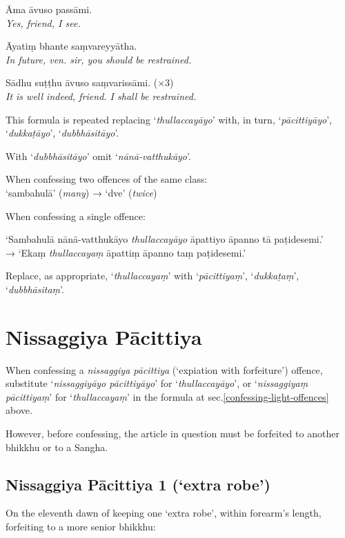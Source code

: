 \hangindent=25pt%
\parbox{22pt}{} Āma āvuso passāmi.\\ \emph{Yes, friend, I see.}

\hangindent=25pt%
\parbox{22pt}{} Āyatiṃ bhante saṃvareyyātha.\\ \emph{In future, ven. sir, you should be restrained.}

\hangindent=25pt%
\parbox{22pt}{} Sādhu suṭṭhu āvuso saṃvarissāmi. (×3)\\ \emph{It is well indeed, friend. I shall be restrained.}

This formula is repeated replacing ‘\emph{thullaccayāyo}’ with, in turn, ‘\emph{pācittiyāyo}’,
‘\emph{dukkaṭāyo}’, ‘\emph{dubbhāsitāyo}’.

With ‘\emph{dubbhāsitāyo}’ omit ‘\emph{nānā-vatthukāyo}’.

When confessing two offences of the same class:\\
‘sambahulā’ (\emph{many}) → ‘dve’ (\emph{twice})

When confessing a single offence:

‘Sambahulā nānā-vatthukāyo \emph{thullaccayāyo} āpattiyo āpanno tā paṭidesemi.’\\
→ ‘Ekaṃ \emph{thullaccayaṃ} āpattiṃ āpanno taṃ paṭidesemi.’

Replace, as appropriate, ‘\emph{thullaccayaṃ}’ with ‘\emph{pācittiyaṃ}’, ‘\emph{dukkaṭaṃ}’, ‘\emph{dubbhāsitaṃ}’.

\section{Nissaggiya Pācittiya}

When confessing a \emph{nissaggiya pācittiya} (‘expiation with forfeiture’)
offence, substitute ‘\emph{nissaggiyāyo pācittiyāyo}’ for
‘\emph{thullaccayāyo}’, or ‘\emph{nissaggiyaṃ pācittiyaṃ}’ for
‘\emph{thullaccayaṃ}’ in the formula at sec.\ref{confessing-light-offences}
above.

However, before confessing, the article in question must be forfeited to another
bhikkhu or to a Sangha. 

\subsection[NP 1 (‘extra robe’)]{Nissaggiya Pācittiya 1 (‘extra robe’)}
\label{np-1-extra-robe}

On the eleventh dawn of keeping one ‘extra robe’, within forearm's length,
forfeiting to a more senior bhikkhu:

